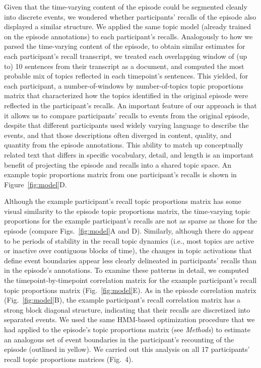 \documentclass[10pt]{article}
\renewcommand{\includegraphics}[2][]{} %
\newcommand{\corrmats}{4} %
\providecommand{\DIFaddtex}[1]{{\protect\color{blue}\uwave{#1}}} %
\providecommand{\DIFaddbegin}{} %
\providecommand{\DIFaddend}{} %
\providecommand{\DIFadd}[1]{\texorpdfstring{\DIFaddtex{#1}}{#1}} %
\newcommand{\DIFaddincludegraphics}[2][]{{\color{blue}\fbox{\DIFOincludegraphics[#1]{#2}}}} %
\DeclareRobustCommand{\DIFaddbegin}{\DIFOaddbegin \let\includegraphics\DIFaddincludegraphics} %
\DeclareRobustCommand{\DIFaddend}{\DIFOaddend \let\includegraphics\DIFOincludegraphics} %
\begin{document}
Given that the time-varying content of the episode could be segmented cleanly into discrete events, we wondered whether participants' recalls of the episode also displayed a similar structure.  We applied the same topic model (already trained on the episode annotations) to each participant's recalls.  Analogously to how we parsed the time-varying content of the episode, to obtain similar estimates for each participant's recall transcript, we treated each overlapping  window of (up to) 10 sentences from their transcript as a document, and computed the most probable mix of topics reflected in each timepoint's sentences.  This yielded, for each participant, a number-of-windows by number-of-topics topic proportions matrix that characterized how the topics identified in the original episode were reflected in the participant's recalls.  An important feature of our approach is that it allows us to compare participants' recalls to events from the original episode, despite that different participants used widely varying language to describe the events, and that those descriptions often diverged in content, quality, and quantity from the episode annotations.  This ability to match up conceptually related text that differs in specific vocabulary, detail, and length is an important benefit of projecting the episode and recalls into a shared topic space.  An example topic proportions matrix from one participant's recalls is shown in Figure~\ref{fig:model}D.

Although the example participant's recall topic proportions matrix has some visual similarity to the episode topic proportions matrix, the time-varying topic proportions for the example participant's recalls are not as sparse as those for the episode (compare Figs.~\ref{fig:model}A and D).  Similarly, although there do appear to be periods of stability in the recall topic dynamics (i.e., most topics are active or inactive over contiguous blocks of time), the changes in topic activations that define event boundaries appear less clearly delineated in participants' recalls than in the episode's annotations.  To examine these patterns in detail, we computed the timepoint-by-timepoint correlation matrix for the example participant's recall topic proportions matrix (Fig.~\ref{fig:model}E).  As in the episode correlation matrix (Fig.~\ref{fig:model}B), the example participant's recall correlation matrix has a strong block diagonal structure, indicating that their recalls are discretized into separated events.  We used the same HMM-based optimization procedure that we had applied to the episode's topic proportions matrix (see \textit{Methods}) to estimate an analogous set of event boundaries in the participant's recounting of the episode (outlined in yellow).  We carried out this analysis on all 17 participants' recall topic proportions matrices (\DIFaddbegin \DIFadd{Supp.\ }\DIFaddend Fig.~\corrmats).
\end{document}
